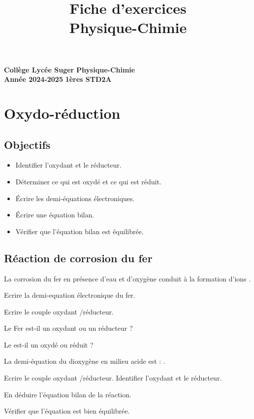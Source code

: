 \documentclass[12pt]{article}
\title{Fiche d'exercices \\ Physique-Chimie}
\author{}
\date{}
\begin{document}
\maketitle

\textbf{Collège Lycée Suger}
\hfill
\textbf{Physique-Chimie} \\

\textbf{Année 2024-2025}
\hfill
\textbf{1ères STD2A} \par

{\let\newpage\relax\maketitle}



\section{Oxydo-réduction}

\subsection*{Objectifs}
\begin{itemize}[compacitem]
    \item Identifier l’oxydant et le réducteur.
    \item Déterminer ce qui est oxydé et ce qui est réduit.
    \item Écrire les demi-équations électroniques.
    \item Écrire une équation bilan.
    \item Vérifier que l’équation bilan est équilibrée.
\end{itemize}



\subsection{Réaction de corrosion du fer}

\begin{compactitem}
    \item La corrosion du fer  en présence d’eau et d’oxygène conduit à la formation d’ions .
    \item Ecrire la demi-equation électronique du fer.
    \item Ecrire le couple oxydant /réducteur.
    \item Le Fer est-il un oxydant ou un réducteur ?
    \item Le  est-il un oxydé ou réduit ?
    \item La demi-équation du dioxygène en milieu acide est : .
    \item Ecrire le couple oxydant /réducteur. Identifier l’oxydant et le réducteur.
    \item En déduire l’équation bilan de la réaction.
    \item Vérifier que l’équation est bien équilibrée.
\end{compactitem}
\end{document}
